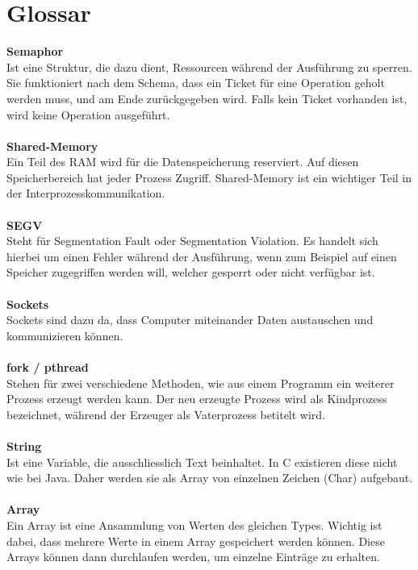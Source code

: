 \documentclass[12pt,a4paper,ngerman]{report}
\begin{document}
\chapter*{Glossar}
\textbf{Semaphor}\\
Ist eine Struktur, die dazu dient, Ressourcen während der Ausführung zu sperren. Sie funktioniert nach dem Schema, dass ein Ticket für eine Operation geholt werden muss, und am Ende zurückgegeben wird. Falls kein Ticket vorhanden ist, wird keine Operation ausgeführt.\\
\\
\textbf{Shared-Memory}\\
Ein Teil des RAM wird für die Datenspeicherung reserviert. Auf diesen Speicherbereich hat jeder Prozess Zugriff. Shared-Memory ist ein wichtiger Teil in der Interprozesskommunikation.\\
\\
\textbf{SEGV}\\
Steht für Segmentation Fault oder Segmentation Violation. Es handelt sich hierbei um einen Fehler während der Ausführung, wenn zum Beispiel auf einen Speicher zugegriffen werden will, welcher gesperrt oder nicht verfügbar ist. \\
\\
\textbf{Sockets}\\
Sockets sind dazu da, dass Computer miteinander Daten austauschen und kommunizieren können. \\
\\
\textbf{fork / pthread}\\
Stehen für zwei verschiedene Methoden, wie aus einem Programm ein weiterer Prozess erzeugt werden kann. Der neu erzeugte Prozess wird als Kindprozess bezeichnet, während der Erzeuger als Vaterprozess betitelt wird.\\
\\
\textbf{String}\\
Ist eine Variable, die ausschliesslich Text beinhaltet. In C existieren diese nicht wie bei Java. Daher werden sie als Array von einzelnen Zeichen (Char) aufgebaut.\\
\\
\textbf{Array}\\
Ein Array ist eine Ansammlung von Werten des gleichen Types. Wichtig ist dabei, dass mehrere Werte in einem Array gespeichert werden können. Diese Arrays können dann durchlaufen werden, um einzelne Einträge zu erhalten.


\nocite{socketserver}
\nocite{fork1}
\nocite{fork2}
\nocite{socketclient}
\nocite{stcmp}
\nocite{substring}
\nocite{gitbk}
\nocite{semctl}
\nocite{unix_environment}
\end{document}
